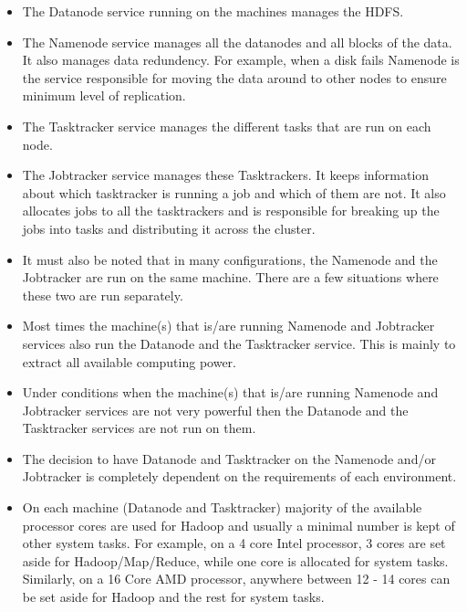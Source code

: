 \documentclass[11pt]{article}
\begin{document}
\begin{itemize}
\item
  The Datanode service running on the machines manages the HDFS.
\item
  The Namenode service manages all the datanodes and all blocks of the
  data. It also manages data redundency. For example, when a disk fails
  Namenode is the service responsible for moving the data around to
  other nodes to ensure minimum level of replication.
\item
  The Tasktracker service manages the different tasks that are run on
  each node.
\item
  The Jobtracker service manages these Tasktrackers. It keeps
  information about which tasktracker is running a job and which of them
  are not. It also allocates jobs to all the tasktrackers and is
  responsible for breaking up the jobs into tasks and distributing it
  across the cluster.
\item
  It must also be noted that in many configurations, the Namenode and
  the Jobtracker are run on the same machine. There are a few situations
  where these two are run separately.
\item
  Most times the machine(s) that is/are running Namenode and Jobtracker
  services also run the Datanode and the Tasktracker service. This is
  mainly to extract all available computing power.
\item
  Under conditions when the machine(s) that is/are running Namenode and
  Jobtracker services are not very powerful then the Datanode and the
  Tasktracker services are not run on them.
\item
  The decision to have Datanode and Tasktracker on the Namenode and/or
  Jobtracker is completely dependent on the requirements of each
  environment.
\item
  On each machine (Datanode and Tasktracker) majority of the available
  processor cores are used for Hadoop and usually a minimal number is
  kept of other system tasks. For example, on a 4 core Intel processor,
  3 cores are set aside for Hadoop/Map/Reduce, while one core is
  allocated for system tasks. Similarly, on a 16 Core AMD processor,
  anywhere between 12 - 14 cores can be set aside for Hadoop and the
  rest for system tasks.
\end{itemize}

\end{document}

